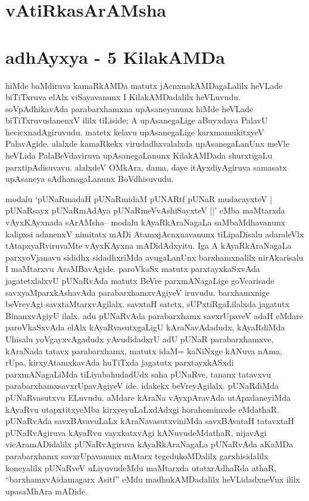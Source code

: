 \begin{center}
\section*{vAtiRkasArAMsha}
\section*{adhAyxya - 5 KilakAMDa}
\end{center}

\begin{artha}
hiMde baMdiruva kamaRkAMDa matutx jAcnxnakAMDagaLalilx heVLade biTiTxruva elAlx viSayavanunx I KilakAMDadalilx heVLuvudu. soVpAdhikavAda parabarxhamxna upAsaneyanunx hiMde heVLade biTiTxruvudanenxV ililx tiLiside; A upAsanegaLige aBuyxdaya PalavU hecicxnadAgiruvudu. matetx kelavu upAsanegaLige karxmamukitxyeV PalavAgide. alalxde kamaRkekx virudadhxvalalxda upAsanegaLanUnx meVle heVLida PalaBeVdaviruva upAsanegaLanunx KilakAMDada shurxtigaLu parxtipAdisuvavu. alalxdeV OMkAra, dama, daye itAyxdiyAgiruva samasatx upAsaneya sAdhanagaLanunx BoVdhisuvudu.
\end{artha}


\begin{artha}
modalu `pUNaRmadaH pUNaRmidaM pUNARtf pUNaR mudacayxteV |
pUNaRsayx pUNaRmAdAya pUNaRmeVvAshiSayxteV ||'
eMba maMtarxda vAyxKAyxnada sArAMsha{\rm --} modalu kAyaRkAraNagaLa saMbaMdhavanunx kalipxsi adanenxV nimitatx mADi AtamxjAcnxnavanunx tiLipaDisalu adaraleVlx tAtapxyaRviruvaMte vAyxKAyxna mADidAdxyitu. Iga A kAyaRkAraNagaLa parxyoVjanavu sididhx sidadhxriMda avugaLanUnx barxhamxnalilx nirAkarisalu I maMtarxvu AraMBavAgide. paroVkaSx matutx parxtayxkaSxvAda jagatetxlalxvU pUNaRvAda matutx BeVre parxmANagaLige goVcarisade savxyaMparxkAshavAda parabarxhamxvAgiyeV iruvudu. barxhamxnige beVreyAgi savxtaMtarxvAgilalx. savxtaH satetx, sUPxtiRgaLilalxda jagatutx BinanxvAgiyU ilalx. adu pUNaRvAda parabarxhamx savxrUpaveV adaH eMdare paroVkaSxvAda elAlx kAyaRvasutxgaLigU kAraNavAdadudx, kAyaRdiMda Uhisalu yoVgayxvAgadudx yAvudidadxrU adU pUNaR parabarxhamxve, kAraNada tatavx parabarxhamx, matutx idaM= kaNiNxge kANuva nAma, rUpa, kirxyAtamxkavAda huTiTxda jagatutx parxtayxkASxdi parxmANagaLiMda tiLiyabahudadUdx saha pUNaRve, tananx tatavxvu parabarxhamxsavxrUpavAgiyeV ide. idakekx beVreyAgilalx. pUNaRdiMda pUNaRvasutxvu ELuvudu. aMdare kAraNa vAyxpAravAda utApxdaneyiMda kAyaRvu utapxtitxyeMba kirxyeyuLaLxdAdxgi horahomimxde eMdathaR. pUNaRvAda savxBAvavuLaLx kAraNavasutxviniMda savxBAvataH tatavxtaH pUNaRvAgiruva kAyaRvu vayxkatxvAgi kANuvudeMdathaR, nijavAgi vicAramADidalilx pUNaRvAgiruva kAyaRkAraNagaLa pUNaRvAda aKaMDa parabarxhamx savxrUpavanunx mAtarx tegedukoMDalilx garxhisidalilx koneyalilx pUNaRveV uLiyuvudeMdu maMtarxda utatxrAdhaRda athaR, ``barxhamxvAidamagarx Asitf'' eMdu madhukAMDadalilx heVLidadxneVnx ililx upasaMhAra mADide.
\end{artha}

